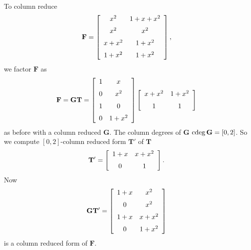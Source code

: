 \begin{example}
To column reduce 
\[
\mathbf{F}=\left[\begin{array}{cc}
{x}^{2} & 1+x+{x}^{2}\\
\noalign{\medskip}{x}^{2} & {x}^{2}\\
\noalign{\medskip}x+{x}^{2} & 1+{x}^{2}\\
\noalign{\medskip}1+{x}^{2} & 1+{x}^{2}
\end{array}\right],
\]
we factor $\mathbf{F}$ as 
\[
\mathbf{F}=\mathbf{G}\mathbf{T}=\left[\begin{array}{cc}
1 & x\\
\noalign{\medskip}0 & {x}^{2}\\
\noalign{\medskip}1 & 0\\
\noalign{\medskip}0 & 1+{x}^{2}
\end{array}\right]\left[\begin{array}{cc}
x+{x}^{2} & 1+{x}^{2}\\
\noalign{\medskip}1 & 1
\end{array}\right]
\]
 as before with a column reduced $\mathbf{G}$. The column degrees
of $\mathbf{G}$ $\cdeg\mathbf{G}=\left[0,2\right]$. So we compute
$\left[0,2\right]$-column reduced form $\mathbf{T}'$ of $\mathbf{T}$
\[
\mathbf{T}'=\left[\begin{array}{cc}
1+x & x+{x}^{2}\\
\noalign{\medskip}0 & 1
\end{array}\right].
\]
 Now 
\[
\mathbf{G}\mathbf{T}'=\left[\begin{array}{cc}
1+x & {x}^{2}\\
\noalign{\medskip}0 & {x}^{2}\\
\noalign{\medskip}1+x & x+{x}^{2}\\
\noalign{\medskip}0 & 1+{x}^{2}
\end{array}\right]
\]
 is a column reduced form of $\mathbf{F}$.\end{example}

